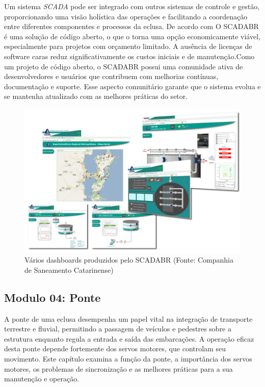 Um sistema \textit{SCADA} pode ser integrado com outros sistemas de controle e gestão, proporcionando uma visão holística das operações e facilitando a coordenação entre diferentes componentes e processos da eclusa. De acordo com \cite{scadabr_manual} O SCADABR é uma solução de código aberto, o que o torna uma opção economicamente viável, especialmente para projetos com orçamento limitado. A ausência de licenças de software caras reduz significativamente os custos iniciais e de manutenção.Como um projeto de código aberto, o SCADABR possui uma comunidade ativa de desenvolvedores e usuários que contribuem com melhorias contínuas, documentação e suporte. Esse aspecto comunitário garante que o sistema evolua e se mantenha atualizado com as melhores práticas do setor.


\begin{figure}[h]
	\centering
	\label{fig:diag_pocos}
		\includegraphics[keepaspectratio=true,scale=0.3]{figuras/dashboard_scadabr.png}
	\caption{Vários dashboards produzidos pelo SCADABR (Fonte: Companhia de Saneamento Catarinense)}
\end{figure}


\subsection{Modulo 04: Ponte}


A ponte de uma eclusa desempenha um papel vital na integração de transporte terrestre e fluvial, permitindo a passagem de veículos e pedestres sobre a estrutura enquanto regula a entrada e saída das embarcações. A operação eficaz desta ponte depende fortemente dos servos motores, que controlam seu movimento. Este capítulo examina a função da ponte, a importância dos servos motores, os problemas de sincronização e as melhores práticas para a sua manutenção e operação.

